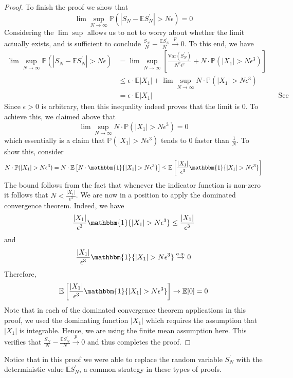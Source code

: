 \documentclass[12pt]{article}
\newcommand*{\abs}[1]{\left\lvert#1\right\rvert}
\newcommand{\E}{\mathbb{E}}
\newcommand{\Var}{\mathrm{Var}}
\newcommand{\Prob}{\mathbb{P}}
\begin{document}
\begin{proof}
 To finish the proof we show that 
 \[\lim \sup_{N \to \infty}  \Prob\left(\abs{S_N - \E S_N^\prime} > N\epsilon\right) = 0\]
 Considering the $\lim \sup$ allows us to not to worry about whether the limit actually exists, and is sufficient to conclude $\frac{S_N}{N} - \frac{\E S_N^\prime}{N} \overset{p}{\to} 0$. To this end, we have
 \begin{align*}
 \lim \sup_{N \to \infty}  \Prob\left(\abs{S_N - \E S_N^\prime} > N\epsilon\right) &= \lim \sup_{N \to \infty} \left[\frac{\Var(S_N^\prime)}{N^2 \epsilon^2}  + N \cdot \Prob(\abs{X_1} > N\epsilon^3) \right] \\
 														       &\leq \epsilon \cdot \E\abs{X_1} + \lim \sup_{N \to \infty} N \cdot \Prob(\abs{X_1} > N\epsilon^3) \\
														       &= \epsilon \cdot \E\abs{X_1}  && \text{See below}
 \end{align*}
 Since $\epsilon > 0$ is arbitrary, then this inequality indeed proves that the limit is $0$. To achieve this, we claimed above that 
 \[\lim \sup_{N \to \infty} N \cdot \Prob(\abs{X_1} > N\epsilon^3) = 0\]
 which essentially is a claim that $\Prob(\abs{X_1} > N\epsilon^3)$ tends to $0$ faster than $\frac{1}{N}$. To show this, consider
 \[N \cdot \Prob(\abs{X_1} > N\epsilon^3) = N \cdot \E\left[N \cdot \mathbbm{1}\{\abs{X_1} > N\epsilon^3\} \right] \leq \E\left[\frac{\abs{X_1}}{\epsilon^3} \mathbbm{1}\{\abs{X_1} > N\epsilon^3\} \right]\]
 The bound follows from the fact that whenever the indicator function is non-zero it follows that $N < \frac{\abs{X_1}}{\epsilon^3}$. We are now in a position to apply the dominated convergence theorem. Indeed, 
 we have 
 \[\frac{\abs{X_1}}{\epsilon^3} \mathbbm{1}\{\abs{X_1} > N\epsilon^3\} \leq \frac{\abs{X_1}}{\epsilon^3}\]
 and
 \[\frac{\abs{X_1}}{\epsilon^3} \mathbbm{1}\{\abs{X_1} > N\epsilon^3\} \overset{a.s.}{\to} 0\]
 Therefore, 
 \[\E\left[\frac{\abs{X_1}}{\epsilon^3} \mathbbm{1}\{\abs{X_1} > N\epsilon^3\} \right] \to \E[0] = 0\]
Note that in each of the dominated convergence theorem applications in this proof, we used the dominating function $\abs{X_1}$ which requires the assumption that $\abs{X_1}$ is integrable. Hence, we are using the finite 
mean assumption here. 
 This verifies that $\frac{S_N}{N} - \frac{\E S_N^\prime}{N} \overset{p}{\to} 0$ and thus completes the proof. 
\end{proof}
Notice that in this proof we were able to replace the random variable $S_N^\prime$ with the deterministic value $\E S_N^\prime$, a common strategy in these types of proofs.  
\end{document}
